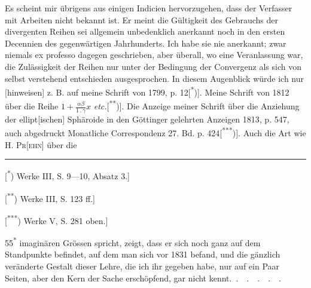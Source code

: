 \indent Es scheint mir übrigens aus einigen Indicien hervorzugehen, dass der Verfasser mit  Arbeiten nicht bekannt ist. Er meint die Gültigkeit des Gebrauchs der divergenten Reihen sei allgemein unbedenklich anerkannt noch in den ersten Decennien des gegenwärtigen Jahrhunderts. Ich habe sie nie anerkannt; zwar niemals ex professo dagegen geschrieben, aber überall, wo eine Veranlassung war, die Zulässigkeit der Reihen nur unter der Bedingung der Convergenz als sich von selbst verstehend entschieden ausgesprochen. In diesem Augenblick würde ich nur [hinweisen] z. B. auf meine Schrift von 1799, p. 12[\textsuperscript{*})]. Meine Schrift von 1812 über die Reihe \(1+\frac{\alpha\beta}{1\,{.}\,\gamma}x\) \textit{etc.}[\textsuperscript{**})]. Die Anzeige meiner Schrift über die Anziehung der ellipt[ischen] Sphäroide in den Göttinger gelehrten Anzeigen 1813, p. 547, auch abgedruckt Monatliche Correspondenz 27. Bd. p. 424[\textsuperscript{***})]. Auch die Art wie H. \textsc{Pr[ehn]} über die
\par\medskip\noindent\rule{.24\linewidth}{.4pt}\par\smallskip
{\small
\noindent\hspace*{\parindent}[\textsuperscript{*}) Werke III, S. 9—10, Absatz 3.]
\par\noindent\hspace*{\parindent}[\textsuperscript{**}) Werke III, S. 123 ff.]
\par\noindent\hspace*{\parindent}[\textsuperscript{***}) Werke V, S. 281 oben.]
\par}
\par\smallskip\noindent\hfill{\small 55\textsuperscript{*}}
\clearpage{}
\noindent imaginären Grössen spricht, zeigt, dass er sich noch ganz auf dem Standpunkte befindet, auf dem man sich vor 1831 befand, und die gänzlich veränderte Gestalt dieser Lehre, die ich ihr gegeben habe, nur auf ein Paar Seiten, aber den Kern der Sache erschöpfend, gar nicht kennt. \(\,{.}\quad{.}\quad{.}\quad{.}\quad{.}\)
